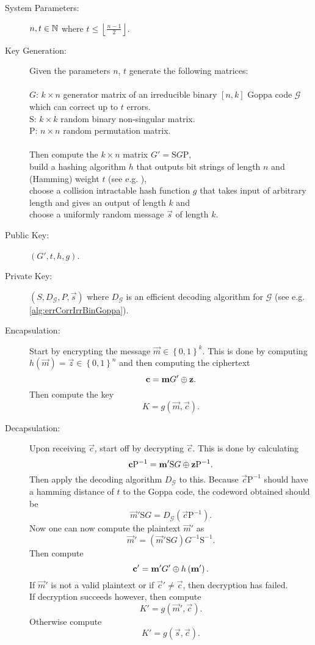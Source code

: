 \begin{description}
	\item[System Parameters:] $n,t \in \mathbb{N}$ where $t \leq \left\lfloor \frac{n-1}{2} \right\rfloor$.
	\item[Key Generation:] Given the parameters $n$, $t$ generate the following matrices:
		\\~\\
		$G$: $k \times n$ generator matrix of an irreducible binary $\left[n,k\right]$ Goppa code $\mathcal{G}$ which can correct up to $t$ errors.\\
		$\mathrm{S}$: $k \times k$ random binary non-singular matrix.\\
		$\mathrm{P}$: $n \times n$ random permutation matrix.
		\\~\\
		Then compute the $k \times n$ matrix $G' = \mathrm{S}G\mathrm{P}$,\\
		build a hashing algorithm $h$ that outputs bit strings of length $n$ and (Hamming) weight $t$ (see e.g. \cite{BP}),\\
		choose a collision intractable hash function $g$ that takes input of arbitrary length and gives an output of length $k$ and\\
		choose a uniformly random message $\vec{s}$ of length $k$.
	\item[Public Key:] $\left(G', t, h, g\right)$.
	\item[Private Key:] $\left(S, D_{\mathcal{G}}, P, \vec{s}\right)$ where $D_{\mathcal{G}}$ is an efficient decoding algorithm for $\mathcal{G}$ (see e.g. \cref{alg:errCorrIrrBinGoppa}).
	\item[Encapsulation:] Start by encrypting the message $\vec{m} \in \left\{ 0,1 \right\}^k$. This is done by computing $h\left(\vec{m}\right) = \vec{z} \in \left\{ 0,1 \right\}^n$ and then computing the ciphertext
		\[
			\boldsymbol{\mathrm{c}} = \boldsymbol{\mathrm{m}} G' \mathbin{\oplus} \boldsymbol{\mathrm{z}}.
		\]
	Then compute the key
		\[
			K = g\left(\vec{m}, \vec{c}\right).
		\]
	\item[Decapsulation:] Upon receiving $\vec{c}$, start off by decrypting $\vec{c}$. This is done by calculating
		\[
			\boldsymbol{\mathrm{c}}\mathrm{P}^{-1} = \boldsymbol{\mathrm{m}}'\mathrm{S}G \mathbin{\oplus} \boldsymbol{\mathrm{z}}\mathrm{P}^{-1}.
		\]
		Then apply the decoding algorithm $D_{\mathcal{G}}$ to this. Because $\vec{c}\mathrm{P}^{-1}$ should have a hamming distance of $t$ to the Goppa code, the codeword obtained should be
		\[
			\vec{m}'\mathrm{S}G = D_{\mathcal{G}} \left( \vec{c}\mathrm{P}^{-1} \right).
		\]
		Now one can now compute the plaintext $\vec{m}'$ as
		\[
			\vec{m}' = \left( \vec{m}'\mathrm{S}G \right)  G^{-1} \mathrm{S}^{-1}.
		\]
		Then compute
		\[
			\boldsymbol{\mathrm{c}}' = \boldsymbol{\mathrm{m}}' G' \mathbin{\oplus} h\left(\boldsymbol{\mathrm{m}}'\right).
		\]
		If $\vec{m}'$ is not a valid plaintext or if $\vec{c}' \neq \vec{c}$, then decryption has failed.\\
		If decryption succeeds however, then compute
		\[
			K' = g\left(\vec{m}', \vec{c}\right).
		\]
		Otherwise compute
		\[
			K' = g\left(\vec{s}, \vec{c}\right).
		\]
\end{description}

